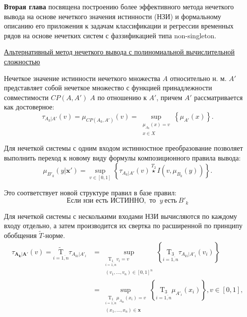 \textbf{Вторая глава} посвящена построению более эффективного метода нечеткого вывода на основе нечеткого значения истинности (НЗИ) и формальному описанию его приложения к задачам классификации и регрессии временных рядов на основе нечетких систем с фаззификацией типа non-singleton.

\ul{Альтернативный метод нечеткого вывода с полиномиальной вычислительной сложностью}

Нечеткое значение истинности нечеткого множества $A$ относительно н. м. $A'$ представляет собой нечеткое множество с функцией принадлежности совместимости $CP(A, A')$ $A$ по отношению к $A'$, причем $A'$ рассматривается как достоверное:
\begin{equation}
	\label{eqn:ftv-compute-12}
	\tau_{A_k|A'}(v) = \mu_{CP(A_k, A')}(v) = \sup_{\substack{\mu_{A_k}(x) = v \\ x \in X}} \left\{ \mu_{A'}(x)\right\}.
\end{equation}


Для нечеткой системы с одним входом истинностное преобразование позволяет выполнить переход к новому виду формулы композиционного правила вывода:
\begin{equation}
	\label{eqn:ftv-compute-5}
	\mu_{B'_k}(y|\mathbf{x'}) = \sup_{v \in [0,1]}\left\{\tau_{A_k|A'}(v) \overset{T_2}{\star} I(v, \mu_{B_k}(y))\right\}.
\end{equation}

Это соответствует новой структуре правил в базе правил:
\begin{equation}
	\text{Если } \textit{нзи} \text{ есть } \text{ИСТИННО}, \text{ то }\ y\ \text{есть}\ B'_k
	\label{eqn:ftv-compute-13}
\end{equation}

Для нечеткой системы с несколькими входами НЗИ вычисляются по каждому входу отдельно, а затем производится их свертка по расширенной по принципу обобщения $\tilde{T}$-норме.
\begin{align}
	\tau_{\mathbf{A_k}|\mathbf{A'}}(v) = \underset{i=\overline{1,n}}{\mathrm{\tilde{T}}} \tau_{A_{ki}|A'_i} &= \sup_{\substack{\underset{i=\overline{1,n}}{\mathrm{T_1}}v_i = v \\ (v_1, \dots, v_n) \in [0, 1]^n}} \left\{\underset{i=\overline{1,n}}{\mathrm{T_3}}\tau_{A_{ki}|A'_i}(v_i)\right\} \label{eqn:ftv-compute-8} \\ &= \sup_{\substack{\underset{i=\overline{1,n}}{\mathrm{T_1}}\mu_{A_{ki}}(x_i)=v \\ (x_1, \dots, x_n) \in \mathbf{x}}} \left\{ \underset{i=\overline{1,n}}{\mathrm{T_3}} \mu_{A'_i}(x_i) \right\}, v \in [0, 1]
	\label{eqn:ftv-compute-9},
\end{align}


